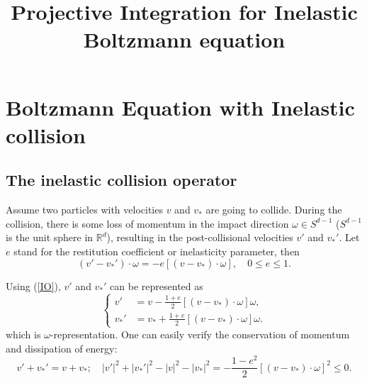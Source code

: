 \documentclass[reqno]{amsart}
\begin{document}
\title{Projective Integration for Inelastic Boltzmann equation}

\maketitle

\section{Boltzmann Equation with Inelastic collision}

\subsection{The inelastic collision operator}

Assume two particles with velocities $v$ and $v_*$ are going to collide. During the collision, there is some loss of momentum in the impact direction $\omega \in S^{d-1}$ ($S^{d-1}$ is the unit sphere in $\mathbb{R}^d$), resulting in the post-collisional velocities $v'$ and $v_*'$. Let $e$ stand for the restitution coefficient or inelasticity parameter, then
\begin{equation} \label{IO}
(v'-v_*')\cdot \omega=-e[(v-v_*)\cdot \omega], \quad 0 \leq e \leq 1.
\end{equation}

Using (\ref{IO}), $v'$ and $v_*'$ can be represented as
\begin{equation}\label{omega}
\left\{
\begin{aligned}
v'&=v-\frac{1+e}{2}[(v-v_*)\cdot \omega ]\omega, \\
v_*'&=v_*+\frac{1+e}{2}[(v-v_*)\cdot \omega]\omega.
\end{aligned}\right.
\end{equation}
which is $\omega$-representation. One can easily verify the conservation of momentum and dissipation of energy:
\begin{equation} \label{momentum}
v'+v_*'=v+v_*; \quad |v'|^2+|v_*'|^2-|v|^2-|v_*|^2=-\frac{1-e^2}{2}[(v-v_*)\cdot \omega]^2\leq 0.
\end{equation}
\end{document}
